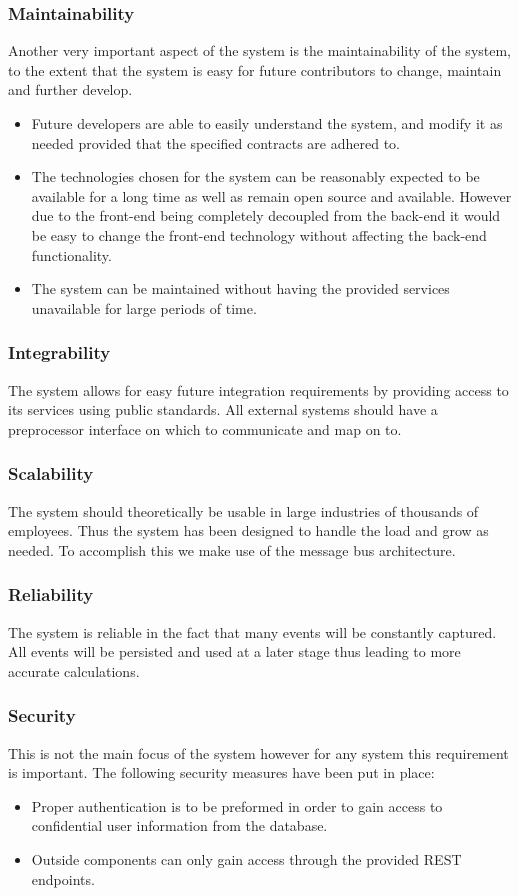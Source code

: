 \documentclass[11pt,a4paper]{article}
\begin{document}
\subsubsection{Maintainability}
Another very important aspect of the system is the maintainability of the system, to the extent that the system is easy for future contributors to change, maintain and further develop.
\begin{itemize}
	\item Future developers are able to easily understand the system, and modify it as needed provided that the specified contracts are adhered to.
	\item The technologies chosen for the system can be reasonably expected to be available for a long time as well as remain open source and available. However due to the front-end being completely decoupled from the back-end it would be easy to change the front-end technology without affecting the back-end functionality.
	\item The system can be maintained without having the provided services unavailable for large periods of time.
\end{itemize}

\subsubsection{Integrability}
The system allows for easy future integration requirements by providing access to its services using public standards. All external systems should have a preprocessor interface on which to communicate and map on to.

\subsubsection{Scalability}
The system should theoretically be usable in large industries of thousands of employees. Thus the system has been designed to handle the load and grow as needed. To accomplish this we make use of the message bus architecture.

\subsubsection{Reliability}
The system is reliable in the fact that many events will be constantly captured. All events will be persisted and used at a later stage thus leading to more accurate calculations.

\subsubsection{Security}
This is not the main focus of the system however for any system this requirement is important. The following security measures have been put in place:
\begin{itemize}
	\item Proper authentication is to be preformed in order to gain access to confidential user information from the database. 
	\item Outside components can only gain access through the provided REST endpoints.
\end{itemize}
\end{document}

